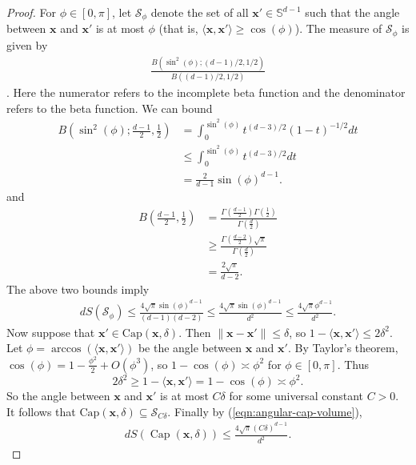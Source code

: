 \documentclass{article}
\theoremstyle{definition}
\newcommand{\mc}{\mathcal}
\DeclareMathOperator{\sphericalcap}{Cap}
\renewcommand{\S}{\mathbb{S}}
\def\vx{{\bm{x}}}
\begin{document}
    \begin{proof}
        For $\phi \in [0, \pi]$, let $\mc{S}_{\phi}$ denote the set of all $\vx' \in \S^{d - 1}$ such that the angle between $\vx$ and $\vx'$ is at most $\phi$ (that is, $\langle \vx, \vx' \rangle \geq \cos(\phi)$). The measure of $\mc{S}_{\phi}$ is given by
    \begin{align*}
        \frac{B(\sin^2(\phi); (d-1)/2, 1/2) }{B((d - 1)/2, 1/2)}
    \end{align*}
    \citep[see, e.g.][]{li2010concise}. Here the numerator refers to the incomplete beta function and the denominator refers to the beta function. We can bound
    \begin{align*}
        B\left(\sin^2(\phi); \frac{d - 1}{2}, \frac{1}{2}\right) &= \int_0^{\sin^2(\phi)} t^{(d-3)/2 }(1 - t)^{-1/2}dt\\
        &\leq \int_0^{\sin^2(\phi)}t^{(d - 3)/2}dt\\
        &= \frac{2}{d - 1} \sin(\phi)^{d - 1}.
    \end{align*}
    and
    \begin{align*}
        B\left(\frac{d - 1}{2}, \frac{1}{2}\right) &= \frac{\Gamma\left(\frac{d -1}{2}\right)\Gamma\left(\frac{1}{2}\right) }{\Gamma\left(\frac{d}{2}\right) }\\
        &\geq \frac{\Gamma\left(\frac{d - 2}{2}\right)\sqrt{\pi} }{\Gamma\left(\frac{d}{2}\right) }\\
        &= \frac{2 \sqrt{\pi}}{d - 2}.
    \end{align*}
    The above two bounds imply
    \begin{align}
        dS(\mc{S}_{\phi}) \leq \frac{4\sqrt{\pi}\sin(\phi)^{d - 1} }{(d - 1)(d - 2) } \leq \frac{4\sqrt{\pi}\sin(\phi)^{d - 1} }{d^2} \leq \frac{4\sqrt{\pi}\phi^{d -1 } }{d^2}.\label{eqn:angular-cap-volume}
    \end{align}
    Now suppose that $\vx' \in \text{Cap}(\vx, \delta)$. Then $\|\vx - \vx'\| \leq \delta$, so $1 - \langle \vx, \vx' \rangle \leq 2\delta^2$. Let $\phi = \arccos(\langle \vx, \vx' \rangle)$ be the angle between $\vx$ and $\vx'$. By Taylor's theorem, $\cos(\phi) = 1 - \frac{\phi^2}{2} + O(\phi^3)$, so $1 - \cos(\phi) \asymp \phi^2$ for $\phi \in [0, \pi]$. Thus
    \[2\delta^2 \geq 1 - \langle \vx, \vx' \rangle = 1 - \cos(\phi) \asymp \phi^2. \]
    So the angle between $\vx$ and $\vx'$ is at most $C\delta$ for some universal constant $C > 0$. It follows that $\text{Cap}(\vx, \delta) \subseteq \mc{S}_{C\delta}$. Finally by (\ref{eqn:angular-cap-volume}),
    \begin{align*}
        dS(\sphericalcap(\vx, \delta)) \leq \frac{4\sqrt{\pi}(C\delta)^{d - 1} }{d^2}.
    \end{align*}
    \end{proof}
\end{document}
